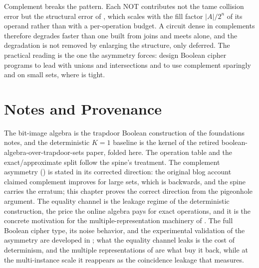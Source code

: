 Complement breaks the pattern. Each NOT contributes not the tame collision
error but the structural error of , which scales
with the fill factor $\lvert A\rvert / 2^n$ of its operand rather than with a
per-operation budget. A circuit dense in complements therefore degrades
faster than one built from joins and meets alone, and the degradation is not
removed by enlarging the structure, only deferred. The practical reading is
the one the asymmetry forces: design Boolean cipher programs to lead with
unions and intersections and to use complement sparingly and on small sets,
where  is tight.

\section{Notes and Provenance}
\label{sec:ch6-notes}

The bit-image algebra is the trapdoor Boolean construction of the
foundations notes, and the deterministic $K = 1$ baseline is the kernel of
the retired boolean-algebra-over-trapdoor-sets paper, folded here. The
operation table and the exact/approximate split follow the spine's
treatment. The complement asymmetry () is stated
in its corrected direction: the original blog account claimed complement
improves for large sets, which is backwards, and the spine carries the
erratum; this chapter proves the correct direction from the pigeonhole
argument. The equality channel is the leakage regime of the deterministic
construction, the price the online algebra pays for exact operations, and it
is the concrete motivation for the multiple-representation machinery of
. The full Boolean cipher type, its noise behavior, and
the experimental validation of the asymmetry are developed in
; what the equality channel leaks is the cost of
determinism, and the multiple representations of  are
what buy it back, while at the multi-instance scale it reappears as the
coincidence leakage that  measures.
